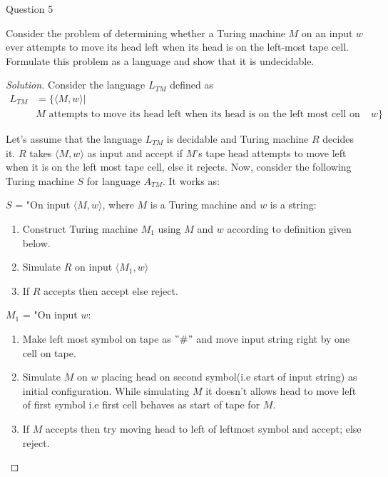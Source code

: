 \begin{solution}{Question 5}\label{ques:5}
    \begin{question}
        Consider the problem of determining whether a Turing machine $M$ on an input $w$ ever attempts to move its head left when its head is on the left-most tape cell. Formulate this problem as a language and show that it is undecidable. 
    \end{question}
    \tcblower{}
    \begin{proof}[Solution]
        Consider the language $L_{TM}$ defined as
        \begin{equation}
            \begin{split}
                L_{TM}  &= \{\langle M, w\rangle | \\
                        &M \text{ attempts to move its head left when its head is on the left most cell on input } w\}
            \end{split}
        \end{equation}
        
        Let's assume that the language $L_{TM}$ is decidable and Turing machine $R$ decides it. $R$ takes $\langle M, w\rangle$ as input and accept if $M$'s tape head attempts to move left when it is on the left most tape cell, else it rejects. Now, consider the following Turing machine $S$ for language $A_{TM}$. It works as:
        
        \bigskip
        
        $S$ = "On input $\langle M, w\rangle$, where $M$ is a Turing machine and $w$ is a string:
        \begin{enumerate}
            \item Construct Turing machine $M_1$ using $M$ and $w$ according to definition given below.
            \item Simulate $R$ on input $\langle M_1, w\rangle$
            \item If $R$ accepts then accept else reject.
        \end{enumerate}
        
        $M_1$ = "On input $w$:
        \begin{enumerate}
            \item Make left most symbol on tape as $"\#"$ and move input string right by one cell on tape.
            \item Simulate $M$ on $w$ placing head on second symbol(i.e start of input string) as initial configuration. While simulating $M$ it doesn't allows head to move left of first symbol i.e first cell behaves as start of tape for $M$.
            \item If $M$ accepts then try moving head to left of leftmost symbol and accept; else reject.
        \end{enumerate}
        

\end{proof}
\end{solution}
